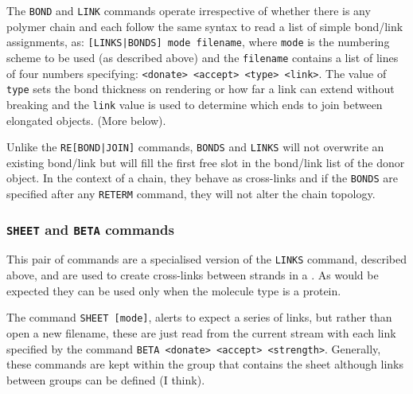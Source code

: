 The {\tt BOND} and {\tt LINK} commands operate irrespective of whether there is any polymer chain
and each follow the same syntax to read a list of simple bond/link assignments, as:
{\tt [LINKS|BONDS] mode filename}, where {\tt mode} is the numbering scheme to be used (as described
above) and the {\tt filename} contains a list of lines of four numbers specifying:
{\tt <donate> <accept> <type> <link>}.   The value of {\tt type} sets the bond thickness on
rendering or how far a link can extend without breaking and the {\tt link} value is used to determine
which ends to join between elongated objects.  (More below).

Unlike the {\tt RE[BOND|JOIN]} commands, {\tt BONDS} and {\tt LINKS} will not
overwrite an existing bond/link but will fill the first free slot in the bond/link list of the
donor object.   In the context of a chain, they behave as cross-links and if the {\tt BONDS} are
specified after any {\tt RETERM} command, they will not alter the chain topology.

\subsubsection{{\tt SHEET} and {\tt BETA} commands}

This pair of commands are a specialised version of the {\tt LINKS} command, described above,
and are used to create cross-links between strands in a \BS.   As would be expected they can
be used only when the molecule type is a protein.

The command {\tt SHEET [mode]}, alerts  to expect a series of links, but rather than
open a new filename, these are just read from the current stream with each link specified by the
command {\tt BETA <donate> <accept> <strength>}.   Generally, these commands are kept within
the group that contains the sheet although links between groups can be defined (I think).

